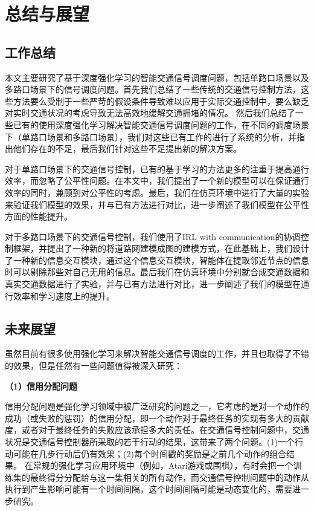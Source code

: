 \chapter{总结与展望}
\section{工作总结}
本文主要研究了基于深度强化学习的智能交通信号调度问题，包括单路口场景以及多路口场景下的信号调度问题。首先我们总结了一些传统的交通信号控制方法，这些方法要么受制于一些严苛的假设条件导致难以应用于实际交通控制中，要么缺乏对实时交通状况的考虑导致无法高效地缓解交通拥堵的情况。
然后我们总结了一些已有的使用深度强化学习解决智能交通信号调度问题的工作，在不同的调度场景下（单路口场景和多路口场景），我们对这些已有工作的进行了系统的分析，并指出他们存在的不足，最后我们针对这些不足提出新的解决方案。

对于单路口场景下的交通信号控制，已有的基于学习的方法更多的注重于提高通行效率，而忽略了公平性问题。在本文中，我们提出了一个新的模型可以在保证通行效率的同时，兼顾到对公平性的考虑。最后，我们在仿真环境中进行了大量的实验来验证我们模型的效果，并与已有方法进行对比，进一步阐述了我们模型在公平性方面的性能提升。

对于多路口场景下的交通信号控制，我们使用了IRL with communication的协调控制框架，并提出了一种新的将道路网建模成图的建模方式，在此基础上，我们设计了一种新的信息交互模块，通过这个信息交互模块，智能体在提取邻近节点的信息时可以剔除那些对自己无用的信息。最后我们在仿真环境中分别就合成交通数据和真实交通数据进行了实验，并与已有方法进行对比，进一步阐述了我们的模型在通行效率和学习速度上的提升。

\section{未来展望}
虽然目前有很多使用强化学习来解决智能交通信号调度的工作，并且也取得了不错的效果，但是任然有一些问题值得被深入研究：

\textbf{（1）信用分配问题}

信用分配问题是强化学习领域中被广泛研究的问题之一，它考虑的是对一个动作的成功（或失败的惩罚）的信用分配，即一个动作对于最终任务的实现有多大的贡献度，或者对于最终任务的失败应该承担多大的责任。在交通信号控制问题中，交通状况是交通信号控制器所采取的若干行动的结果，这带来了两个问题。(1)一个行动可能在几步行动后仍有效果；(2)每个时间戳的奖励是之前几个动作的组合结果。
在常规的强化学习应用环境中（例如，Atari游戏或围棋），有时会把一个训练集的最终得分分配给与这一集相关的所有动作，而交通信号控制问题中的动作从执行到产生影响可能有一个时间间隔，这个时间间隔可能是动态变化的，需要进一步研究。

